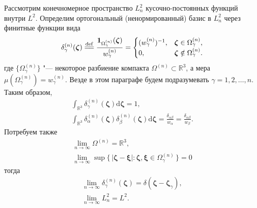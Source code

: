 \documentclass{article}
\newcommand{\dd}{\mathrm{d}}
\newcommand{\dzeta}{\boldsymbol{\dd\zeta}}
\newcommand{\bzeta}{\boldsymbol{\zeta}}
\newcommand{\bxi}{\boldsymbol{\xi}}
\newcommand{\Set}[2]{\{\,{#1}:{#2}\,\}}
\newcommand{\eqdef}{\overset{\mathrm{def}}{=\joinrel=}}
\begin{document}
Рассмотрим конечномерное пространство \(L^2_n\) кусочно-постоянных функций внутри \(L^2\).
Определим ортогональный (ненормированный) базис в \(L^2_n\) через финитные функции вида
\begin{equation}\label{eq:delta_definition}
    \delta^{(n)}_\gamma(\bzeta) \eqdef \frac{\mathbf{1}_{\Omega^{(n)}_\gamma}(\bzeta)}{w^{(n)}_\gamma} =
    \begin{cases}
        (w^{(n)}_\gamma)^{-1}, & \bzeta\in\Omega^{(n)}_\gamma, \\
        0, & \bzeta\notin\Omega^{(n)}_\gamma. \\
    \end{cases}
\end{equation}
где \(\{\Omega^{(n)}_\gamma\}\) "--- некоторое разбиение компакта \(\Omega^{(n)}\subset\mathbb{R}^3\),
а мера \(\mu(\Omega^{(n)}_\gamma) = w^{(n)}_\gamma\). Везде в этом параграфе будем подразумевать \(\gamma=1,2,\dots,n\).
Таким образом,
\begin{gather}
    \int_{\mathbb{R}^3} \delta^{(n)}_\gamma(\bzeta) \dzeta = 1, \label{eq:L2n_norm}\\
    \int_{\mathbb{R}^3} \delta^{(n)}_\alpha(\bzeta) \delta^{(n)}_\beta(\bzeta) \dzeta =
    \frac{\delta_{\alpha\beta}}{w_\alpha} = \frac{\delta_{\alpha\beta}}{w_\beta}. \label{eq:L2n_orth}
\end{gather}
Потребуем также
\begin{gather}
    \lim_{n\to\infty} \Omega^{(n)} = \mathbb{R}^3, \label{eq:Omega_limit}\\
    \lim_{n\to\infty} \sup\Set{|\bzeta-\bxi|}{\bzeta,\bxi\in\Omega^{(n)}_\gamma} = 0 \label{eq:diameter_limit}
\end{gather}
тогда
\begin{gather}
    \lim_{n\to\infty} \delta^{(n)}_\gamma(\bzeta) = \delta(\bzeta-\bzeta_\gamma), \label{eq:delta_limit}\\
    \lim_{n\to\infty} L^2_n = L^2. \label{eq:subspace_limit}
\end{gather}
\end{document}
